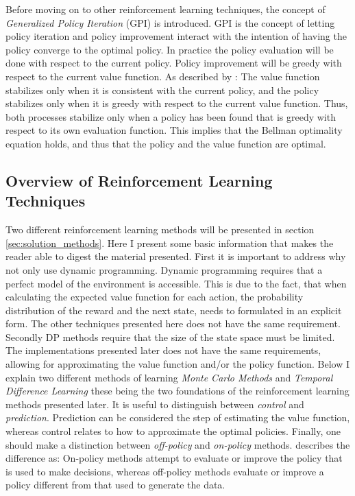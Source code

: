  Before moving on to other reinforcement learning techniques, the concept of \textit{Generalized Policy Iteration} (GPI) is introduced. GPI is the concept of letting policy iteration and policy improvement interact with the intention of having the policy converge to the optimal policy. In practice the policy evaluation will be done with respect to the current policy. Policy improvement will be greedy with respect to the current value function. As described by \textcite{sutton_reinforcement_2018}: The value function stabilizes only when it is consistent with the current policy, and the policy stabilizes
only when it is greedy with respect to the current value function.
Thus, both processes stabilize only when a policy has been found that is greedy with respect to its own evaluation function. This implies that the Bellman optimality equation holds, and thus that the policy and the value function are optimal.
 
 \subsection{Overview of Reinforcement Learning Techniques}
 
Two different reinforcement learning methods will be presented in section \ref{sec:solution_methods}. Here I present some basic information that makes the reader able to digest the material presented. First it is important to address why not only use dynamic programming. Dynamic programming requires that a perfect model of the environment is accessible. This is due to the fact, that when calculating the expected value function for each action, the probability distribution of the reward and the next state, needs to formulated in an explicit form. The other techniques presented here does not have the same requirement. Secondly DP methods require that the size of the state space must be limited. The implementations presented later does not have the same requirements, allowing for approximating the value function and/or the policy function. Below I explain two different methods of learning \textit{Monte Carlo Methods} and \textit{Temporal Difference Learning} these being the two foundations of the reinforcement learning methods presented later. It is useful to distinguish between \textit{control} and \textit{prediction}. Prediction can be considered the step of estimating the value function, whereas control relates to how to approximate the optimal policies. Finally, one should make a distinction between \textit{off-policy} and \textit{on-policy} methods. \textcite{sutton_reinforcement_2018} describes the difference as: On-policy methods attempt to evaluate or improve the policy that is used to make decisions, whereas off-policy methods evaluate or improve a policy different from that used to generate the data.

